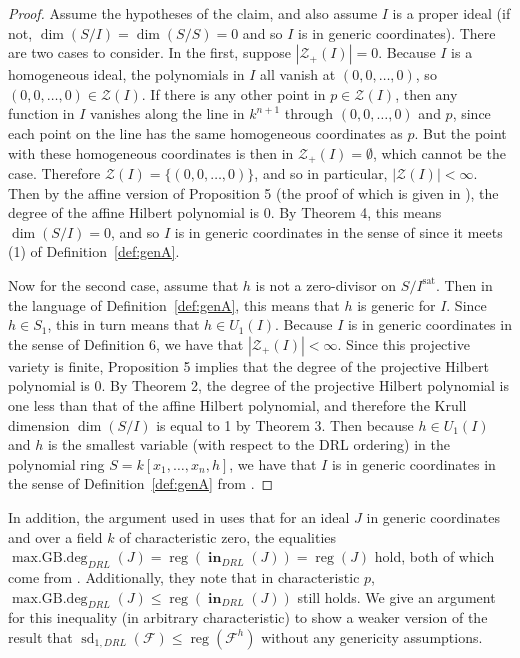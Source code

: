 \documentclass[11pt]{article}
\newcommand{\F}{\mathcal{F}}
\newcommand{\sat}{^{\text{sat}}}
\DeclareMathOperator{\Init}{\mathbf{in}}
\DeclareMathOperator{\sd}{sd}
\DeclareMathOperator{\reg}{reg}
\DeclareMathOperator{\mdeg}{max.GB.deg}
\theoremstyle{definition}
\begin{document}
\begin{proof}
	Assume the hypotheses of the claim, and also assume $I$ is a proper ideal (if not, $\dim(S/I) = \dim(S/S) = 0$ and so $I$ is in generic coordinates). There are two cases to consider. In the first, suppose $|\mathcal{Z}_+(I)| = 0$. Because $I$ is a homogeneous ideal, the polynomials in $I$ all vanish at $(0,0, \dots, 0)$, so $(0,0,\dots,0) \in \mathcal{Z}(I)$. If there is any other point in $p \in \mathcal{Z}(I)$, then any function in $I$ vanishes along the line in $k^{n+1}$ through $(0,0,\dots,0)$ and $p$, since each point on the line has the same homogeneous coordinates as $p$. But the point with these homogeneous coordinates is then in $\mathcal{Z}_+(I) = \emptyset$, which cannot be the case. Therefore $\mathcal{Z}(I) = \{(0,0,\dots,0)\}$, and so in particular, $|\mathcal{Z}(I)| < \infty$. Then by the affine version of Proposition 5 (the proof of which is given in \cite{cox2013ideals}), the degree of the affine Hilbert polynomial is 0. By Theorem 4, this means $\dim(S/I) = 0$, and so $I$ is in generic coordinates in the sense of \cite{bayer1987criterion} since it meets (1) of Definition~\ref{def:genA}. 

	Now for the second case, assume that $h$ is not a zero-divisor on $S/I\sat$. Then in the language of Definition~\ref{def:genA}, this means that $h$ is generic for $I$. Since $h \in S_1$, this in turn means that $h \in U_1(I)$. Because $I$ is in generic coordinates in the sense of Definition 6, we have that $|\mathcal{Z}_+(I)| < \infty$. Since this projective variety is finite, Proposition 5 implies that the degree of the projective Hilbert polynomial is 0. By Theorem 2, the degree of the projective Hilbert polynomial is one less than that of the affine Hilbert polynomial, and therefore the Krull dimension $\dim(S/I)$ is equal to 1 by Theorem 3. Then because $h \in U_1(I)$ and $h$ is the smallest variable (with respect to the DRL ordering) in the polynomial ring $S = k[x_1, \dots, x_n, h]$, we have that $I$ is in generic coordinates in the sense of Definition~\ref{def:genA} from \cite{bayer1987criterion}. 
\end{proof}


In addition, the argument used in \cite{caminata2020solving} uses that for an ideal $J$ in generic coordinates and over a field $k$ of characteristic zero, the equalities $\mdeg_{DRL}(J) = \reg(\Init_{DRL}(J)) = \reg(J)$ hold, both of which come from \cite{bayer1987criterion}. Additionally, they note that in characteristic $p$, $\mdeg_{DRL}(J) \leq \reg(\Init_{DRL}(J))$ still holds. We give an argument for this inequality (in arbitrary characteristic) to show a weaker version of the result that $\sd_{1,DRL}(\F) \leq \reg(\F^h)$ without any genericity assumptions. 
\end{document}
